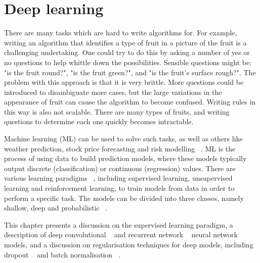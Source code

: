 
\chapter{Deep learning}

\ifpdf
     \graphicspath{{Figs/Chapter2/}}
\else
    \graphicspath{{Chapter2/Figs/Vector/}{Chapter2/Figs/}}
\fi

There are many tasks which are hard to write algorithms for. For example, writing an algorithm that identifies a type of fruit in a picture of the fruit is a challenging undertaking. One could try to do this by asking a number of yes or no questions to help whittle down the possibilities. Sensible questions might be: "is the fruit round?", "is the fruit green?", and "is the fruit's surface rough?". The problem with this approach is that it is very brittle. More questions could be introduced to disambiguate more cases, but the large variations in the appearance of fruit can cause the algorithm to become confused. Writing rules in this way is also not scalable. There are many types of fruits, and writing questions to determine each one quickly becomes intractable. \par
 
\noindent Machine learning (ML) can be used to solve such tasks, as well as others like weather prediction, stock price forecasting and risk modelling \unskip ~\citep{hastie2009elements}. ML is the process of using data to build prediction models, where these models typically output discrete (classification) or continuous (regression) values. There are various learning paradigms \unskip ~\citep{murphy2012machine}, including supervised learning, unsupervised learning and reinforcement learning, to train models from data in order to perform a specific task. The models can be divided into three classes, namely shallow, deep and probabilistic ~\citep{hastie2009elements, murphy2012machine}. \par

\noindent This chapter presents a discussion on the supervised learning paradigm, a description of deep convolutional \unskip ~\citep{lecun1998gradient} and recurrent network \unskip ~\citep{werbos1988generalization} neural network models, and a discussion on regularisation techniques for deep models, including dropout \unskip ~\citep{srivastava2014dropout} and batch normalisation \unskip ~\citep{ioffe2015batch}. 


